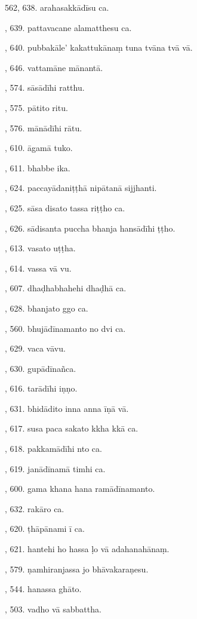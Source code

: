 562, 638. arahasakkādīsu ca.\par {}, 639. pattavacane alamatthesu ca.\par {}, 640. pubbakāle’ kakattukānaṃ tuna tvāna tvā vā.\par {}, 646. vattamāne mānantā.\par {}, 574. sāsādīhi ratthu.\par {}, 575. pātito ritu.\par {}, 576. mānādīhi rātu.\par {}, 610. āgamā tuko.\par {}, 611. bhabbe ika.\par {}, 624. paccayādaniṭṭhā nipātanā sijjhanti.\par {}, 625. sāsa disato tassa riṭṭho ca.\par {}, 626. sādisanta puccha bhanja hansādīhi ṭṭho.\par {}, 613. vasato uṭṭha.\par {}, 614. vassa vā vu.\par {}, 607. dhaḍhabhahehi dhaḍhā ca.\par {}, 628. bhanjato ggo ca.\par {}, 560. bhujādīnamanto no dvi ca.\par {}, 629. vaca vāvu.\par {}, 630. gupādīnañca.\par {}, 616. tarādīhi iṇṇo.\par {}, 631. bhidādito inna anna īṇā vā.\par {}, 617. susa paca sakato kkha kkā ca.\par {}, 618. pakkamādīhi nto ca.\par {}, 619. janādīnamā timhi ca.\par {}, 600. gama khana hana ramādīnamanto.\par {}, 632. rakāro ca.\par {}, 620. ṭhāpānami ī ca.\par {}, 621. hantehi ho hassa ḷo vā adahanahānaṃ.\par {}, 579. ṇamhiranjassa jo bhāvakaraṇesu.\par {}, 544. hanassa ghāto.\par {}, 503. vadho vā sabbattha.\par \noindent
